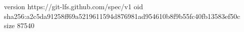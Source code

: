 version https://git-lfs.github.com/spec/v1
oid sha256:a2c5da91258ff69a5219611594d876981ad954610b8f9b55fc40fb13583ef50c
size 87540
